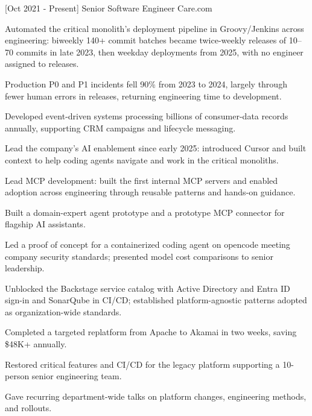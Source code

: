 \documentclass[]{moak-resume}
\begin{document}
  \begin{entrylist}
    \experienceentry
    {[Oct 2021 - Present]}
    {Senior Software Engineer}
    {Care.com}
    {}
  \end{entrylist}
  \begin{experienceitems}
    \item Automated the critical monolith's deployment pipeline in Groovy/Jenkins across engineering: biweekly 140+ commit batches became twice-weekly releases of 10--70 commits in late 2023, then weekday deployments from 2025, with no engineer assigned to releases.
    \item Production P0 and P1 incidents fell 90\% from 2023 to 2024, largely through fewer human errors in releases, returning engineering time to development.
    \item Developed event-driven systems processing billions of consumer-data records annually, supporting CRM campaigns and lifecycle messaging.
    \item Lead the company's AI enablement since early 2025: introduced Cursor and built context to help coding agents navigate and work in the critical monoliths.
    \item Lead MCP development: built the first internal MCP servers and enabled adoption across engineering through reusable patterns and hands-on guidance.
    \item Built a domain-expert agent prototype and a prototype MCP connector for flagship AI assistants.
    \item Led a proof of concept for a containerized coding agent on opencode meeting company security standards; presented model cost comparisons to senior leadership.
    \item Unblocked the Backstage service catalog with Active Directory and Entra ID sign-in and SonarQube in CI/CD; established platform-agnostic patterns adopted as organization-wide standards.
    \item Completed a targeted replatform from Apache to Akamai in two weeks, saving \$48K+ annually.
    \item Restored critical features and CI/CD for the legacy platform supporting a 10-person senior engineering team.
    \item Gave recurring department-wide talks on platform changes, engineering methods, and rollouts.
  \end{experienceitems}
  \experiencegap
\end{document}

